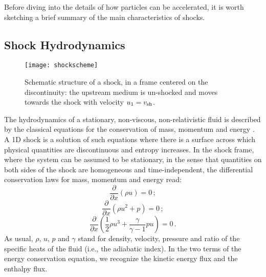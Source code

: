 \documentclass[varenna]{cimento}
\newcommand{\vsh}{v_{\rm sh}}
\begin{document}
Before diving into the details of how particles can be accelerated, it is worth sketching a brief summary of the main characteristics of shocks.

\subsection{Shock Hydrodynamics}\label{ssec:hydro}
\begin{wrapfigure}[11]{r}{0.47\textwidth}
\centering
\vspace{-1cm}
\hspace{0.3cm}
		\texttt{[image: shockscheme]}
\caption{Schematic structure of a shock, in a frame centered on the discontinuity: the upstream medium is un-shocked and moves towards the shock with velocity $u_1=\vsh$.}
	\label{fig:shockscheme}
\end{wrapfigure}

The hydrodynamics of a stationary, non-viscous, non-relativistic fluid is described by the classical equations for the conservation of mass, momentum and energy \cite{landau6}. 
A 1D shock is a solution of such equations where there is a surface across which physical quantities are discontinuous and entropy increases. 
In the shock frame, where the system can be assumed to be stationary, in the sense that quantities on both sides of the shock are homogeneous and time-independent, the differential conservation laws for mass, momentum and energy read:
\begin{equation}
\frac{\partial}{\partial x}\left( \rho u \right) = 0\,;
\end{equation}
\begin{equation}
\frac{\partial}{\partial x} \left( \rho u^2 + p\right)=0\,;
\end{equation}
\begin{equation}
\frac{\partial}{\partial x} \left( \frac{1}{2}\rho u^3 + 
\frac{\gamma }{\gamma-1}p u\right) = 0\,.
\end{equation}
As usual, $\rho$, $u$, $p$ and $\gamma$ stand for density, velocity, pressure and ratio of the specific heats of the fluid (i.e., the adiabatic index). 
In the two terms of the energy conservation equation, we recognize the kinetic energy flux and the enthalpy flux.
\end{document}

